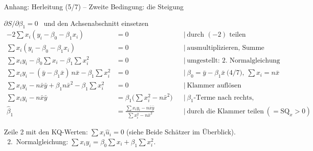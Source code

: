 \documentclass[aspectratio=169,11pt]{beamer}
\newcommand{\tsum}{\textstyle\sum}
\newcommand{\SQx}{\text{SQ}_x}
\begin{document}
\begin{frame}{Anhang: Herleitung (5/7) -- Zweite Bedingung: die Steigung}
  \begin{block}{$\partial S / \partial \beta_1 = 0$ \ und den Achsenabschnitt einsetzen}
    \vspace{-8pt}
    \small
    \begin{align*}
      -2\tsum x_i (y_i - \beta_0 - \beta_1 x_i) &= 0
        && \mid\ \text{durch } (-2) \text{ teilen} \\
      \tsum x_i (y_i - \beta_0 - \beta_1 x_i) &= 0
        && \mid\ \text{ausmultiplizieren, Summe aufteilen} \\
      \tsum x_i y_i - \beta_0 \tsum x_i - \beta_1 \tsum x_i^{2} &= 0
        && \mid\ \text{umgestellt: 2.\ Normalgleichung} \\
      \tsum x_i y_i - (\bar{y} - \beta_1 \bar{x})\, n\bar{x} - \beta_1 \tsum x_i^{2} &= 0
        && \mid\ \beta_0 = \bar{y} - \beta_1 \bar{x} \ \text{(4/7)}, \ \tsum x_i = n\bar{x} \\
      \tsum x_i y_i - n\bar{x}\bar{y} + \beta_1 n\bar{x}^{2} - \beta_1 \tsum x_i^{2} &= 0
        && \mid\ \text{Klammer auflösen} \\
      \tsum x_i y_i - n\bar{x}\bar{y} &= \beta_1 \bigl(\tsum x_i^{2} - n\bar{x}^{2}\bigr)
        && \mid\ \beta_1\text{-Terme nach rechts, ausklammern} \\
      \hat{\beta}_1 &= \frac{\tsum x_i y_i - n\bar{x}\bar{y}}{\tsum x_i^{2} - n\bar{x}^{2}}
        && \mid\ \text{durch die Klammer teilen} \ (= \SQx > 0)
    \end{align*}
    \vspace{-14pt}
  \end{block}

  \footnotesize Zeile 2 mit den KQ-Werten: $\sum x_i \hat{u}_i = 0$ (siehe
  \glqq Beide Schätzer im Überblick\grqq). \ 2.\ Normalgleichung:
  $\sum x_i y_i = \beta_0 \sum x_i + \beta_1 \sum x_i^{2}$.
\end{frame}
\end{document}
